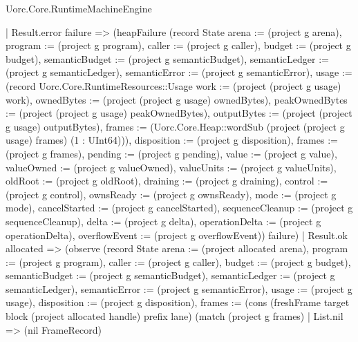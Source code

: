 \begin{lexlean}{Uorc.Core.RuntimeMachineEngine}
\begin{semanticmodule}
{        | Result.error failure => (heapFailure (record State {arena := (project g arena), program := (project g program), caller := (project g caller), budget := (project g budget), semanticBudget := (project g semanticBudget), semanticLedger := (project g semanticLedger), semanticError := (project g semanticError), usage := (record Uorc.Core.RuntimeResources::Usage {work := (project (project g usage) work), ownedBytes := (project (project g usage) ownedBytes), peakOwnedBytes := (project (project g usage) peakOwnedBytes), outputBytes := (project (project g usage) outputBytes), frames := (Uorc.Core.Heap::wordSub (project (project g usage) frames) (1 : UInt64))}), disposition := (project g disposition), frames := (project g frames), pending := (project g pending), value := (project g value), valueOwned := (project g valueOwned), valueUnits := (project g valueUnits), oldRoot := (project g oldRoot), draining := (project g draining), control := (project g control), ownsReady := (project g ownsReady), mode := (project g mode), cancelStarted := (project g cancelStarted), sequenceCleanup := (project g sequenceCleanup), delta := (project g delta), operationDelta := (project g operationDelta), overflowEvent := (project g overflowEvent)}) failure)
        | Result.ok allocated => (observe (record State {arena := (project allocated arena), program := (project g program), caller := (project g caller), budget := (project g budget), semanticBudget := (project g semanticBudget), semanticLedger := (project g semanticLedger), semanticError := (project g semanticError), usage := (project g usage), disposition := (project g disposition), frames := (cons (freshFrame target block (project allocated handle) prefix lane) (match (project g frames)
          | List.nil => (nil FrameRecord)
}}
\end{semanticmodule}
\end{lexlean}
